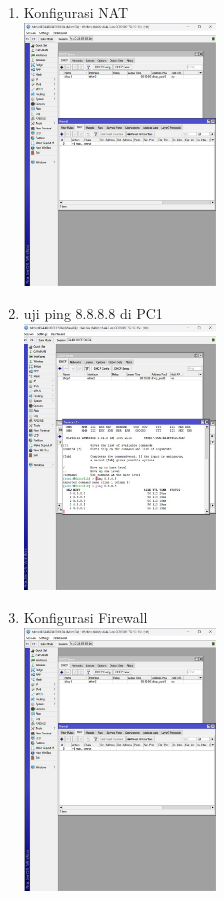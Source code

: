 \begin{enumerate}
	\item Konfigurasi NAT\\
	\includegraphics[width=0.4\textwidth]{p4/img/NAT.jpg}
	\item uji ping 8.8.8.8 di PC1\\
	\includegraphics[width=0.4\textwidth]{p4/img/8888_p1.jpg}
	\item Konfigurasi Firewall\\
	\includegraphics[width=0.4\textwidth]{p4/img/firewall_set.jpg}

\end{enumerate}
